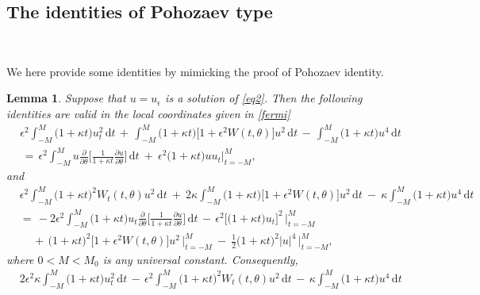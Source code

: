 \documentclass[10pt, reqno]{amsart}
\numberwithin{equation}{section}
\newtheorem{lemma}[theorem]{Lemma}
\theoremstyle{definition}
\begin{document}
{{\subsection{ The identities of Pohozaev type}\label{Section4.1}\


 We here provide some identities by mimicking the proof of Pohozaev identity.

\begin{lemma}\label{lemmaPohozaev}
 Suppose that $u=u_\epsilon$ is a solution of \eqref{eq2}. %
 Then the following identities are valid in the local coordinates given in \eqref{fermi}
\begin{align}
 &\epsilon^2\int_{-M}^{M} \big({1+\kappa t}\big) u_t^2 \,{\mathrm d}t
 \,+\,
 \int_{-M}^{M} \big({1+\kappa t}\big) \big[1+ \epsilon^2 W (t, \theta) \big] u^2 \,{\mathrm d}t
 \,-\,
 \int_{-M}^{M} \big({1+\kappa t}\big) u^4 \,{\mathrm d}t
\nonumber\\[2mm]
 &\,=\,
 \epsilon^2\int_{-M}^{M} u
 \frac{\partial}{\partial\theta} \Big[ \frac{1}{1+\kappa t} \frac{\partial u}{\partial\theta} \Big] \,{\mathrm d}t
 \ +\
 \epsilon^2\big(1+\kappa t\big) u u_t \Bigg|_{t=-M}^{M},
 \label{first identity}
\end{align}
 and
\begin{align}
 & \epsilon^2 \int_{-M}^{M} \big(1+\kappa t\big)^2 W_t(t, \theta) u^2 \,{\mathrm d}t
 \ +\
 2\kappa \int_{-M}^{M} \big(1+\kappa t\big) \big[1+ \epsilon^2 W(t, \theta)\big] u^2 \,{\mathrm d}t
 \ - \ \kappa \int_{-M}^{M} \big(1+\kappa t\big) u^4 \,{\mathrm d}t
\nonumber\\[2mm]
 &=\,
 -2 \epsilon^2\int_{-M}^{M} \big(1+\kappa t\big) u_t \frac{\partial}{\partial\theta}
 \Big[ \frac{1}{1+\kappa t} \frac{\partial u}{\partial\theta} \Big]\,{\mathrm d}t
 \,-\,
 \epsilon^2\Big[ \big(1+\kappa t\big) u_t\Big]^2\, \Bigg|_{t=-M}^{M}
\nonumber\\[2mm]
 &\quad
 \,+\,
 \big(1+\kappa t\big)^2 \big[1+ \epsilon^2 W(t, \theta)\big] u^2\, \Bigg|_{t=-M}^{M}
 \ -\
 \frac{1}{2} \big(1+\kappa t\big)^2 |u|^4\, \Bigg|_{t=-M}^{M},
 \label{second identity}
\end{align}
 where $0<M<M_0$ is any universal constant.
 Consequently,
\begin{align}
 &2\epsilon^2 \kappa\int_{-M}^{M} \big({1+\kappa t}\big) u_t^2 \,{\mathrm d}t
 \,-\,
 \epsilon^2 \int_{-M}^{M} \big(1+\kappa t\big)^2 W_t(t, \theta) u^2 \,{\mathrm d}t
 \,-\,
 \kappa\int_{-M}^{M} \big({1+\kappa t}\big) u^4 \,{\mathrm d}t
\nonumber\\[2mm]

\end{align}
\end{lemma}}}
\end{document}
